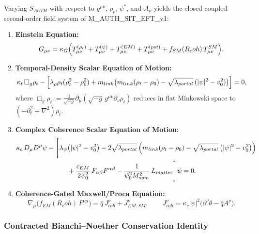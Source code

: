 \documentclass[american,11pt,letterpaper]{article}
\newcommand{\Rcoh}{R_{\mathrm{coh}}}
\def\mathcal#1{#1}%
\def\mathrm#1{#1}%
\def\texttt#1{#1}%
\def\Rcoh{R_coh}%
\begin{document}
Varying $S_{\mathrm{AUTH}}$ with respect to $g^{\mu\nu}$, $\rho_t$, $\psi^*$, and $A_\nu$ yields the closed coupled second-order field system of \texttt{M\_AUTH\_SIT\_EFT\_v1}:
\begin{enumerate}[leftmargin=2em]
  \item \textbf{Einstein Equation:}
  \begin{equation}
  G_{\mu\nu} = \kappa_G\Bigl(T_{\mu\nu}^{(\rho_t)} + T_{\mu\nu}^{(\psi)} + T_{\mu\nu}^{(\mathrm{EM})} + T_{\mu\nu}^{(\mathrm{pot})} + f_{\mathrm{SM}}(\Rcoh)\,T_{\mu\nu}^{\mathrm{SM}}\Bigr).
  \label{eq:covariant_einstein_sec5}
  \end{equation}
  \item \textbf{Temporal-Density Scalar Equation of Motion:}
  \begin{equation}
  \kappa_t\,\Box_g\rho_t
  - \Bigl[\lambda_\rho\rho_t(\rho_t^2 - \rho_0^2) + m_{\mathrm{link}}\bigl(m_{\mathrm{link}}(\rho_t - \rho_0) - \sqrt{\lambda_{\mathrm{portal}}}\,(|\psi|^2 - v_0^2)\bigr)\Bigr] = 0,
  \label{eq:rhot_eom_canonical}
  \end{equation}
  where $\Box_g\rho_t := \frac{1}{\sqrt{-g}}\partial_\mu(\sqrt{-g}\,g^{\mu\nu}\partial_\nu\rho_t)$ reduces in flat Minkowski space to $(-\partial_t^2 + \nabla^2)\rho_t$.
  \item \textbf{Complex Coherence Scalar Equation of Motion:}
  \begin{align}
  \kappa_c\,D_\mu D^\mu\psi
  &- \Biggl[
    \lambda_\psi\bigl(|\psi|^2 - v_0^2\bigr)
    - 2\sqrt{\lambda_{\mathrm{portal}}}\,\Bigl(m_{\mathrm{link}}(\rho_t - \rho_0) - \sqrt{\lambda_{\mathrm{portal}}}\,\bigl(|\psi|^2 - v_0^2\bigr)\Bigr)
    \nonumber\\
  &\qquad\quad
    + \frac{c_{\mathrm{EM}}}{2\psi_0^2}\,F_{\alpha\beta}F^{\alpha\beta}
    - \frac{1}{\psi_0^2 M_{\mathrm{sym}}^2}\,\mathcal{L}_{\mathrm{matter}}
  \Biggr]\psi = 0.
  \label{eq:Rcoh-eom}
  \end{align}
  \item \textbf{Coherence-Gated Maxwell/Proca Equation:}
  \begin{equation}
  \nabla_\mu\bigl(f_{\mathrm{EM}}(\Rcoh)\,F^{\nu\mu}\bigr)
  = \hat{q}\,J^\nu_{\mathrm{coh}} + J^\nu_{\mathrm{EM,SM}},
  \qquad
  J^\nu_{\mathrm{coh}} = \kappa_c|\psi|^2\bigl(\partial^\nu\theta - \hat{q}A^\nu\bigr).
  \label{eq:maxwell_proca_eom_canonical}
  \end{equation}
\end{enumerate}

\subsubsection{Contracted Bianchi--Noether Conservation Identity}
\end{document}
